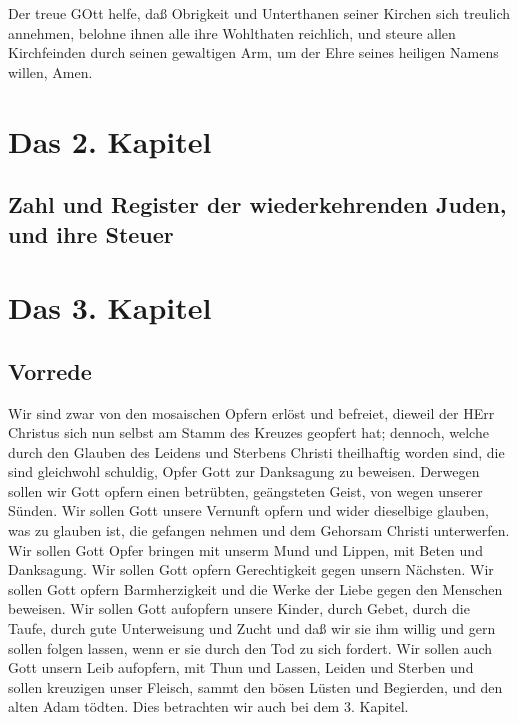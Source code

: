 Der treue GOtt helfe, daß Obrigkeit und Unterthanen seiner Kirchen sich treulich annehmen, belohne ihnen alle ihre Wohlthaten reichlich, und steure allen Kirchfeinden durch seinen gewaltigen Arm, um der Ehre seines heiligen Namens willen, Amen.

\chapter{Das 2. Kapitel}

\section[Zahl und Register der wiederkehrenden Juden, und ihre]{Zahl und Register der wiederkehrenden Juden, und ihre Steuer}



\chapter{Das 3. Kapitel}

\section{Vorrede}

Wir sind zwar von den mosaischen Opfern erlöst und befreiet, dieweil der HErr Christus sich nun selbst am Stamm des Kreuzes geopfert hat; dennoch, welche durch den Glauben des Leidens und Sterbens Christi theilhaftig worden sind, die sind gleichwohl schuldig, Opfer Gott zur Danksagung zu beweisen. Derwegen sollen wir Gott opfern einen betrübten, geängsteten Geist, von wegen unserer Sünden. Wir sollen Gott unsere Vernunft opfern und wider dieselbige glauben, was zu glauben ist, die gefangen nehmen und dem Gehorsam Christi unterwerfen. Wir sollen Gott Opfer bringen mit unserm Mund und Lippen, mit Beten und Danksagung. Wir sollen Gott opfern Gerechtigkeit gegen unsern Nächsten. Wir sollen Gott opfern Barmherzigkeit und die Werke der Liebe gegen den Menschen beweisen. Wir sollen Gott aufopfern unsere Kinder, durch Gebet, durch die Taufe, durch gute Unterweisung und Zucht und daß wir sie ihm willig und gern sollen folgen lassen, wenn er sie durch den Tod zu sich fordert. Wir sollen auch Gott unsern Leib aufopfern, mit Thun und Lassen, Leiden und Sterben und sollen kreuzigen unser Fleisch, sammt den bösen Lüsten und Begierden, und den alten Adam tödten. Dies betrachten wir auch bei dem 3. Kapitel.

